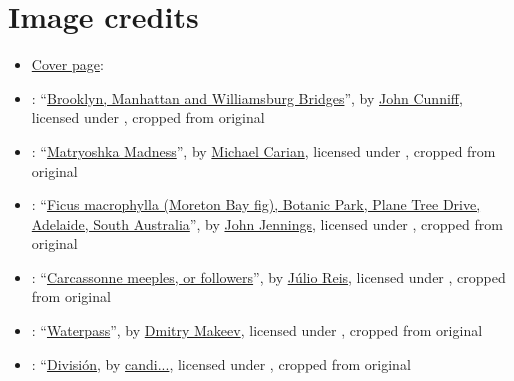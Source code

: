 


\chapter{Image credits}

\begin{itemize}

\item \hyperlink{page.i}{Cover page}:

\item {}:
``\href{https://www.flickr.com/photos/johncunniff/19486177769/}{Brooklyn, Manhattan and Williamsburg Bridges}'', by \href{https://www.flickr.com/photos/johncunniff/}{John Cunniff}, licensed under , cropped from original

\item {}: ``\href{https://www.flickr.com/photos/carianoff/4484964103/}{Matryoshka Madness}'', by \href{https://www.flickr.com/photos/carianoff/}{Michael Carian}, licensed under , cropped from original

\item {}: ``\href{https://www.flickr.com/photos/124930081@N08/31594099295/}{Ficus macrophylla (Moreton Bay fig), Botanic Park, Plane Tree Drive, Adelaide, South Australia}'', by \href{https://www.flickr.com/photos/124930081@N08/}{John Jennings}, licensed under , cropped from original

\item {}: ``\href{https://commons.wikimedia.org/wiki/File:Carcassonne_Miples.jpg}{Carcassonne meeples, or followers}'', by \href{https://commons.wikimedia.org/wiki/User:Tintazul}{Júlio Reis}, licensed under , cropped from original

\item {}: ``\href{https://commons.wikimedia.org/wiki/File:Waterpass.jpg}{Waterpass}'', by \href{https://commons.wikimedia.org/wiki/User:Knopik-som}{Dmitry Makeev}, licensed under , cropped from original

\item {}: ``\href{https://www.flickr.com/photos/candibj/48576057741/}{Divisi\'{o}n}, by \href{https://www.flickr.com/photos/candibj/}{candi...}, licensed under , cropped from original


\end{itemize}
